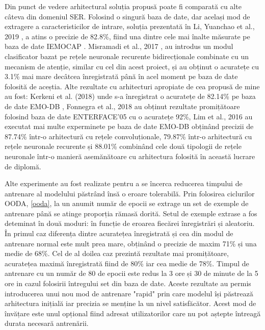 \documentclass[a4paper,12pt]{book}
\begin{document}
		 Din punct de vedere arhitectural soluția propusă poate fi comparată cu alte câteva din domeniul SER. Folosind o singură baza de date, dar același mod de extragere a caracteristicilor de intrare, soluția prezentată în Li, Yuanchao et al., 2019 \cite{yuan}, a atins o precizie de 82.8\%, fiind una dintre cele mai înalte măsurate pe baza de date IEMOCAP \cite{iemocap}. Misramadi et al., 2017 \cite{misramadi}, au introdus un modul clasificator bazat pe rețele neuronale recurente bidirecționale combinate cu un mecanism de atenție, similar cu cel din acest proiect, și au obținut o acuratețe cu 3.1\% mai mare decâtcea înregistrată până în acel moment pe baza de date folosită de aceștia. Alte rezultate cu arhitecturi apropiate de cea propusă de mine au fost:  Kerkeni et al. (2018) \cite{compar1} unde s-a înregistrat o acuratețe de 82.14\% pe baza de date EMO-DB \cite{emodb}, Fonnegra et al., 2018 \cite{compar2} au obținut rezultate promițătoare folosind baza de date ENTERFACE'05 \cite{enterface} cu o acuratețe 92\%, Lim et al., 2016 \cite{compar3} au executat mai multe experminete pe baza de date EMO-DB \cite{emodb} obținând precizii de 87.74\% într-o arhitectură cu rețele convoluționale, 79.87\% într-o arhitectură cu rețele neuronale recurente și 88.01\% combinând cele două tipologii de rețele neuronale într-o manieră asemănătoare cu arhitectura folosită în această lucrare de diplomă. \par
		 
		 Alte experimente au fost realizate pentru a se încerca reducerea timpului de antrenare al modelului păstrând însă o eroare tolerabilă. Prin folosirea ciclurilor OODA, \ref{ooda}, la un anumit număr de epocii se extrage un set de exemple de antrenare până se atinge proporția rămasă dorită. Setul de exemple extrase a fos deteminat în două moduri: în funcție de eroarea fiecărei înregistrări și aleatoriu. În primul caz diferența dintre acuratețea înregistrată și cea din modul de antrenare normal este mult prea mare, obținând o precizie de maxim 71\% și una medie de 68\%. Cel de al doilea caz prezintă rezultate mai promițătoare, acuratețea maximă înregistrată fiind de 80\% iar cea medie de 78\%. Timpul de antrenare cu un număr de 80 de epocii este redus la 3 ore și 30 de minute de la 5 ore in cazul folosirii întregului set din baza de date. Aceste rezultate au permis introducerea unui nou mod de antrenare "rapid" prin care modelul își păstrează arhitectura inițială iar precizia se menține la un nivel satisfăcător. Acest mod de învățare este unul opțional fiind adresat utilizatorilor care nu pot aștepte întreagă durata necesară antrenării.
\end{document}
